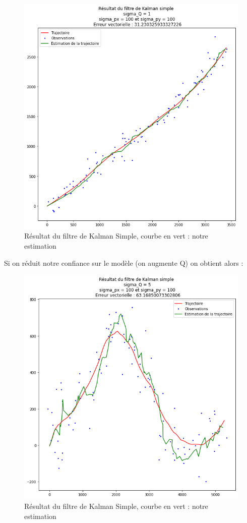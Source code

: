 \begin{figure}[hbt!]
	\centering
	\includegraphics[scale=0.5]{./images/res1.png}
	\caption{\centering Résultat du filtre de Kalman Simple, courbe en vert : notre estimation}
\end{figure}
\FloatBarrier

\newpage

Si on réduit notre confiance sur le modèle (on augmente Q) on obtient alors :

\begin{figure}[hbt!]
	\centering
	\includegraphics[scale=0.4]{./images/res2.png}
	\caption{\centering Résultat du filtre de Kalman Simple, courbe en vert : notre estimation}
\end{figure}
\FloatBarrier

